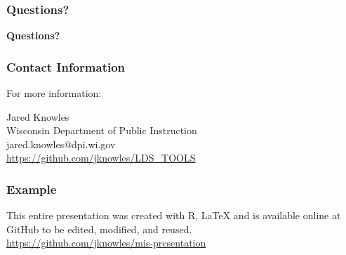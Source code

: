 \documentclass[12pt,handout]{beamer}
\begin{document}
{
\begin{frame}[plain]
\frametitle{Questions?}
\vspace{.6in}
\begin{flushright}
\Huge \textbf{Questions?}
\end{flushright}
\vspace{.14in}
\end{frame}
}


\begin{frame}
\frametitle{Contact Information}
\Large For more information:
\vspace{.1in}
\begin{center}
\large Jared Knowles \\
Wisconsin Department of Public Instruction \\
jared.knowles@dpi.wi.gov \\
\textcolor{blue}{\href{https://github.com/jknowles/LDS_TOOLS}{https://github.com/jknowles/LDS\_TOOLS}} \\
\end{center}
\end{frame}

\begin{frame}
\frametitle{Example}
\vspace{.3in}
\large This entire presentation was created with R, \LaTeX{} and is available online at GitHub to be edited, modified, and reused. \\
\textcolor{blue}{\href{https://github.com/jknowles/mis-presentation}{https://github.com/jknowles/mis-presentation}}
\end{frame}
\end{document}
